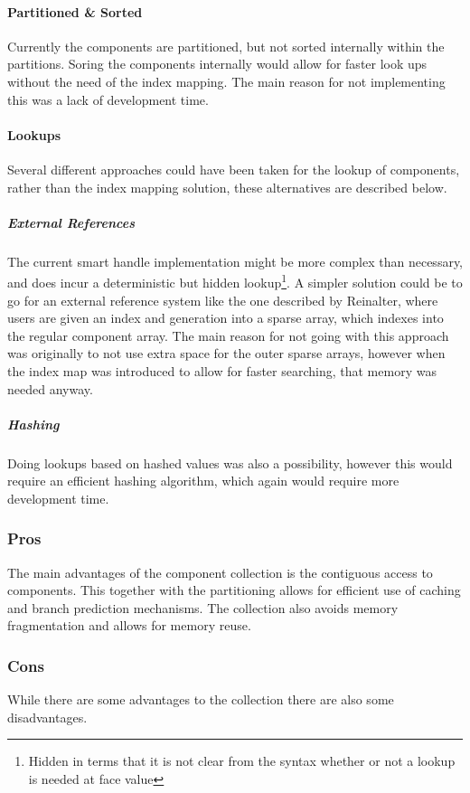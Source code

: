 \paragraph{Partitioned \& Sorted}
Currently the components are partitioned, but not sorted internally within the partitions.
Soring the components internally would allow for faster look ups without the need of the index mapping.
The main reason for not implementing this was a lack of development time.

\paragraph{Lookups}
Several different approaches could have been taken for the lookup of components, rather than the index mapping solution,
these alternatives are described below.

\subparagraph{External References}
The current smart handle implementation might be more complex than necessary, and does incur a deterministic but hidden lookup\footnote{Hidden in terms that it is not clear from the syntax whether or not a lookup is needed at face value}.
A simpler solution could be to go for an external reference system like the one described by Reinalter\cite{molecular_matters_dod_external_references},
where users are given an index and generation into a sparse array, which indexes into the regular component array.
The main reason for not going with this approach was originally to not use extra space for the outer sparse arrays,
however when the index map was introduced to allow for faster searching, that memory was needed anyway.

\subparagraph{Hashing}
Doing lookups based on hashed values was also a possibility, however this would require an efficient hashing algorithm,
which again would require more development time.

\subsubsection{Pros}
The main advantages of the component collection is the contiguous access to components.
This together with the partitioning allows for efficient use of caching and branch prediction mechanisms.
The collection also avoids memory fragmentation and allows for memory reuse.

\subsubsection{Cons}
While there are some advantages to the collection there are also some disadvantages.

